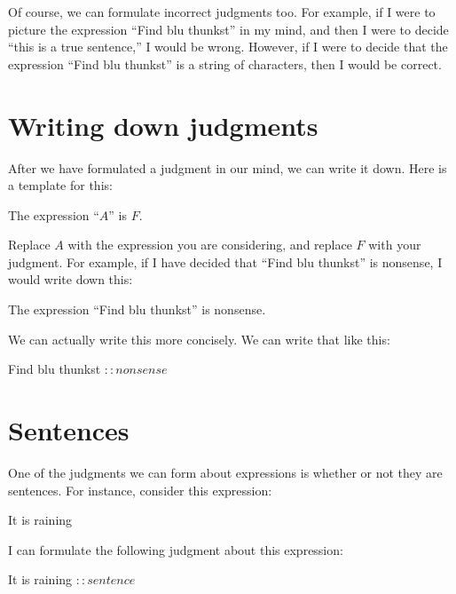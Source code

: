 \documentclass[../../../main.tex]{subfiles}
\begin{document}
Of course, we can formulate incorrect judgments too. For example, if I were to picture the expression ``Find blu thunkst'' in my mind, and then I were to decide ``this is a true sentence,'' I would be wrong. However, if I were to decide that the expression ``Find blu thunkst'' is a string of characters, then I would be correct.


\section{Writing down judgments}

After we have formulated a judgment in our mind, we can write it down. Here is a template for this:

\begin{center}
  The expression ``$A$'' is $F$.
\end{center}

\noindent
Replace $A$ with the expression you are considering, and replace $F$ with your judgment. For example, if I have decided that ``Find blu thunkst'' is nonsense, I would write down this:

\begin{center}
  The expression ``Find blu thunkst'' is nonsense.
\end{center}

\noindent
We can actually write this more concisely. We can write that like this:

\begin{center}
  Find blu thunkst $:: nonsense$
\end{center}


\section{Sentences}

One of the judgments we can form about expressions is whether or not they are sentences. For instance, consider this expression:

\begin{center}
  It is raining
\end{center}

\noindent
I can formulate the following judgment about this expression:

\begin{center}
  It is raining $:: sentence$
\end{center}
\end{document}
